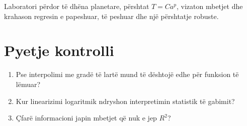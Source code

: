 \begin{lidhje}
Laboratori përdor të dhëna planetare, përshtat $T=C a^p$, vizaton mbetjet dhe krahason regresin e papeshuar, të peshuar dhe një përshtatje robuste.
\end{lidhje}

\section*{Pyetje kontrolli}
\begin{enumerate}
\item Pse interpolimi me gradë të lartë mund të dështojë edhe për funksion të lëmuar?
\item Kur linearizimi logaritmik ndryshon interpretimin statistik të gabimit?
\item Çfarë informacioni japin mbetjet që nuk e jep $R^2$?
\end{enumerate}



